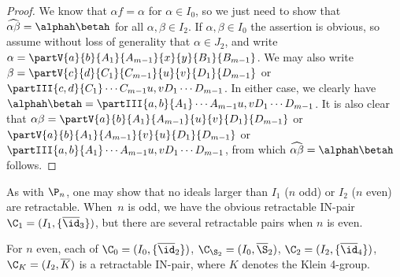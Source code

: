 \begin{proof}
We know that $\alpha f=\alpha$ for $\alpha\in I_0$, so we just need to show that $\widehat{\alpha\beta}=\alphah\betah$ for all $\alpha,\beta\in I_2$.
If $\alpha,\beta\in I_0$ the assertion is obvious, so assume without loss of generality that $\alpha\in J_2$,
and write $\alpha = \partV{a}{b}{A_1}{A_{m-1}}{x}{y}{B_1}{B_{m-1}}$.  We may also write $\beta=\partV{c}{d}{C_1}{C_{m-1}}{u}{v}{D_1}{D_{m-1}}$ or $\partIII{c,d}{C_1}\cdots{C_{m-1}}{u,v}{D_1}\cdots{D_{m-1}}$.  In either case, we clearly have $\alphah\betah=\partIII{a,b}{A_1}\cdots{A_{m-1}}{u,v}{D_1}\cdots{D_{m-1}}$.  It is also clear that
$\alpha\beta = \partV{a}{b}{A_1}{A_{m-1}}{u}{v}{D_1}{D_{m-1}}$
or $\partV{a}{b}{A_1}{A_{m-1}}{v}{u}{D_1}{D_{m-1}}$ or~$\partIII{a,b}{A_1}\cdots{A_{m-1}}{u,v}{D_1}\cdots{D_{m-1}}$, from which $\widehat{\alpha\beta}=\alphah\betah$ follows. \end{proof}

As with $\P_n$, one may show that no ideals larger than $I_1$ ($n$ odd) or $I_2$ ($n$ even) are retractable.
%
When~$n$ is odd, we have the obvious retractable IN-pair $\C_1=(I_1,\{\overline\id_3\})$, but there are several retractable pairs when $n$ is even.



\begin{lemma}
\label{BCtriples}
For $n$ even, each of $\C_0=(I_0,\{\overline{\id}_2\})$,
$\C_{\S_2}=(I_0,\overline{\S}_2)$,
$\C_2=(I_2,\{\overline{\id}_4\})$,
$\C_K=(I_2,\overline{K})$
is a retractable IN-pair, where $K$ denotes the Klein 4-group.
\end{lemma}

